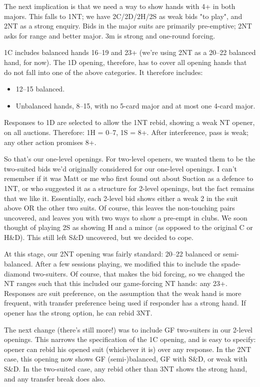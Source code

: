 \documentclass[a4paper,12pt]{article}
\begin{document}
The next implication is that we need a way to show hands with 4+ in both
majors.  This falls to 1NT; we have 2C/2D/2H/2S as weak bids "to play", and 2NT
as a strong enquiry.  Bids in the major suits are primarily pre-emptive; 2NT
asks for range and better major.  3m is strong and one-round forcing.

1C includes balanced hands 16--19 and 23+ (we're using 2NT as a 20--22 balanced
hand, for now).  The 1D opening, therefore, has to cover all opening hands that
do not fall into one of the above categories.  It therefore includes:

\begin{itemize}
\item 12--15 balanced.
\item Unbalanced hands, 8--15, with no 5-card major and at most one 4-card
      major.
\end{itemize}

Responses to 1D are selected to allow the 1NT rebid, showing a weak NT opener,
on all auctions.  Therefore: 1H = 0--7, 1S = 8+.  After interference, pass is
weak; any other action promises 8+.

So that's our one-level openings.  For two-level openers, we wanted them to be
the two-suited bids we'd originally considered for our one-level openings.  I
can't remember if it was Matt or me who first found out about Suction as a
defence to 1NT, or who suggested it as a structure for 2-level openings, but
the fact remains that we like it.  Essentially, each 2-level bid shows either a
weak 2 in the suit above OR the other two suits.  Of course, this leaves the
non-touching pairs uncovered, and leaves you with two ways to show a pre-empt
in clubs.  We soon thought of playing 2S as showing H and a minor (as opposed
to the original C or H\&D).  This still left S\&D uncovered, but we decided to
cope.

At this stage, our 2NT opening was fairly standard: 20--22 balanced or
semi-balanced.  After a few sessions playing, we modified this to include the
spade-diamond two-suiters.  Of course, that makes the bid forcing, so we
changed the NT ranges such that this included our game-forcing NT hands: any
23+.  Responses are suit preference, on the assumption that the weak hand is
more frequent, with transfer preference being used if responder has a strong
hand.  If opener has the strong option, he can rebid 3NT.

The next change (there's still more!) was to include GF two-suiters in our
2-level openings.  This narrows the specification of the 1C opening, and is
easy to specify: opener can rebid his opened suit (whichever it is) over any
response.  In the 2NT case, this opening now shows GF (semi-)balanced, GF with
S\&D, or weak with S\&D.  In the two-suited case, any rebid other than 3NT shows
the strong hand, and any transfer break does also.
\end{document}

